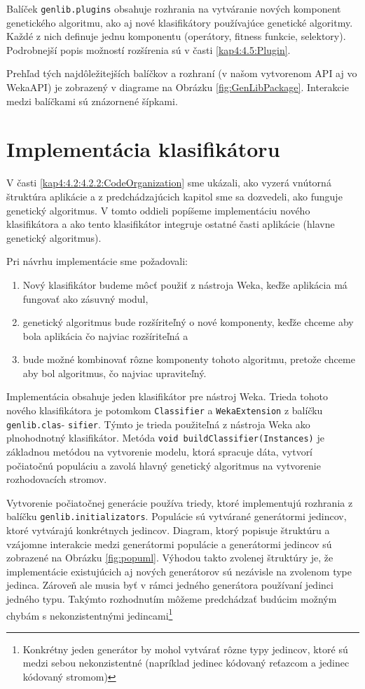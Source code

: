 Balíček \verb|genlib.plugins| obsahuje rozhrania na vytváranie nových komponent genetického algoritmu, ako aj nové klasifikátory používajúce genetické algoritmy. Každé z nich definuje jednu komponentu (operátory, fitness funkcie, selektory). Podrobnejší popis možností rozšírenia sú v časti \ref{kap4:4.5:Plugin}.

Prehľad tých najdôležitejších balíčkov a rozhraní (v našom vytvorenom API aj vo WekaAPI) je zobrazený v diagrame na Obrázku \ref{fig:GenLibPackage}. Interakcie medzi balíčkami sú znázornené šípkami.
\section{Implementácia klasifikátoru}\label{kap4:4.3:Implementation}
V časti \ref{kap4:4.2:4.2.2:CodeOrganization} sme ukázali, ako vyzerá vnútorná štruktúra aplikácie a z predchádzajúcich kapitol sme sa dozvedeli, ako funguje genetický algoritmus. V tomto oddieli popíšeme implementáciu nového klasifikátora a ako tento klasifikátor integruje ostatné časti aplikácie (hlavne genetický algoritmus).

Pri návrhu implementácie sme požadovali:
\begin{enumerate}
\item Nový klasifikátor budeme môcť použiť z nástroja Weka, keďže aplikácia má fungovať ako zásuvný modul,
\item genetický algoritmus bude rozšíriteľný o nové komponenty, keďže chceme aby bola aplikácia čo najviac rozšíriteľná a
\item bude možné kombinovať rôzne komponenty tohoto algoritmu, pretože chceme aby bol algoritmus, čo najviac upraviteľný.
\end{enumerate}

Implementácia obsahuje jeden klasifikátor pre nástroj Weka. Trieda tohoto nového klasifikátora je potomkom \verb|Classifier| a \verb|WekaExtension| z balíčku \verb|genlib.clas|- \verb|sifier|. Týmto je trieda použiteľná z nástroja Weka ako plnohodnotný klasifikátor. Metóda \verb|void buildClassifier(Instances)| je základnou metódou na vytvorenie modelu, ktorá spracuje dáta, vytvorí počiatočnú populáciu a zavolá hlavný genetický algoritmus na vytvorenie rozhodovacích stromov. 

Vytvorenie počiatočnej generácie používa triedy, ktoré implementujú rozhrania z balíčku \verb|genlib.initializators|. Populácie sú vytvárané generátormi jedincov, ktoré vytvárajú konkrétnych jedincov. Diagram, ktorý popisuje štruktúru a vzájomne interakcie medzi generátormi populácie a generátormi jedincov sú zobrazené na Obrázku \ref{fig:popuml}. Výhodou takto zvolenej štruktúry je, že implementácie existujúcich aj nových generátorov sú nezávisle na zvolenom type jedinca. Zároveň ale musia byť v rámci jedného generátora používaní jedinci jedného typu. Takýmto rozhodnutím môžeme predchádzať budúcim možným chybám s nekonzistentnými jedincami\footnote{Konkrétny jeden generátor by mohol vytvárať rôzne typy jedincov, ktoré sú medzi sebou nekonzistentné (napríklad jedinec kódovaný reťazcom a jedinec kódovaný stromom)}

